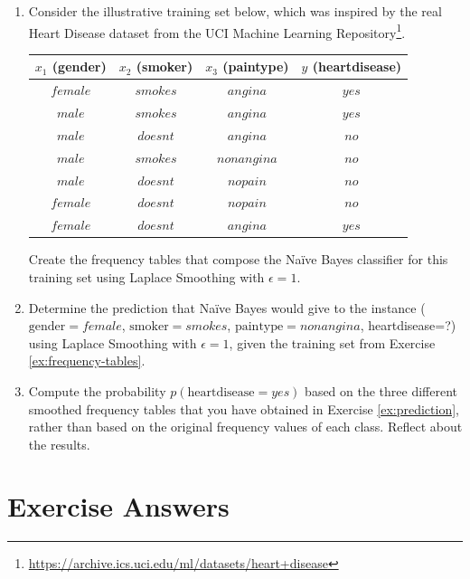 \begin{enumerate}

\item \label{ex:frequency-tables} Consider the illustrative training set below, which was inspired by the real Heart Disease dataset from the UCI Machine Learning Repository\footnote{\url{https://archive.ics.uci.edu/ml/datasets/heart+disease}}.

\begin{center}
\begin{tabular}{|c|c|c|c|}\hline
$x_1$ (gender) & $x_2$ (smoker) & $x_3$ (paintype) & $y$ (heartdisease) \\ \hline
$female$ & $smokes$ & $angina$ & $yes$ \\ \hline
$male$ & $smokes$ & $angina$ & $yes$ \\ \hline
$male$ & $doesnt$ & $angina$ & $no$ \\ \hline
$male$ & $smokes$ & $nonangina$ & $no$ \\ \hline
$male$ & $doesnt$ & $nopain$ & $no$ \\ \hline
$female$ & $doesnt$ & $nopain$ & $no$ \\ \hline
$female$ & $doesnt$ & $angina$ & $yes$\\ \hline
\end{tabular} 
\end{center}

Create the frequency tables that compose the Na\"ive Bayes classifier for this training set using Laplace Smoothing with $\epsilon=1$. 

\item \label{ex:prediction} Determine the prediction that Na\"ive Bayes would give to the instance ($\text{gender}=female$, $\text{smoker}=smokes$, $\text{paintype}=nonangina$, heartdisease=?) using Laplace Smoothing with $\epsilon=1$, given the training set from Exercise \ref{ex:frequency-tables}.

\item \label{ex:laplace} Compute the probability $p(\text{heartdisease}=yes)$ based on the three different smoothed frequency tables that you have obtained in Exercise \ref{ex:prediction}, rather than based on the original frequency values of each class. Reflect about the results.

\end{enumerate}



\section{Exercise Answers}



